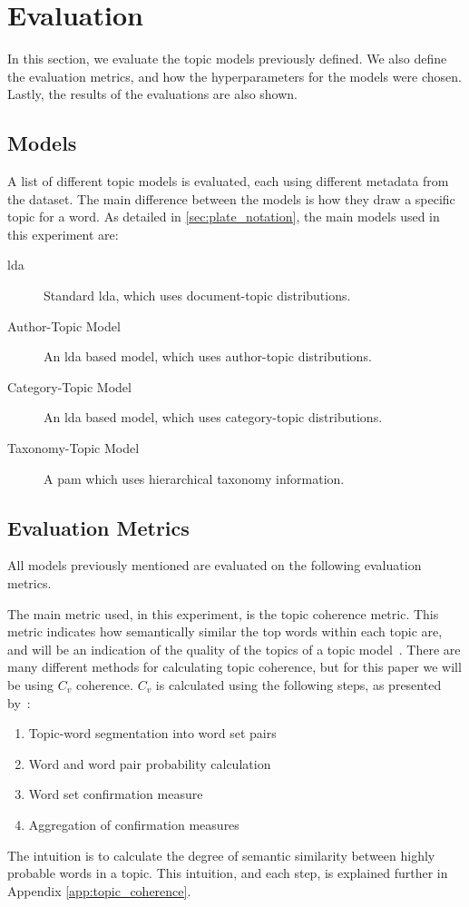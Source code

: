 \section{Evaluation}\label{sec:experiment}
In this section, we evaluate the topic models previously defined.
We also define the evaluation metrics, and how the hyperparameters for the models were chosen.
Lastly, the results of the evaluations are also shown.

\subsection{Models}\label{sec:experiment_models}
A list of different topic models is evaluated, each using different metadata from the dataset.
The main difference between the models is how they draw a specific topic for a word.
As detailed in \autoref{sec:plate_notation}, the main models used in this experiment are:
\begin{description}
	\item[\Acrlong{lda}] Standard \gls{lda}, which uses document-topic distributions.
	\item[Author-Topic Model]\cite{author_topic_2012} An \gls{lda} based model, which uses author-topic distributions.
	\item[Category-Topic Model] An \gls{lda} based model, which uses category-topic distributions.
	\item[Taxonomy-Topic Model] A \acrlong{pam} which uses hierarchical taxonomy information.
\end{description}

\subsection{Evaluation Metrics}\label{sec:experiment_metrics}
All models previously mentioned are evaluated on the following evaluation metrics.

The main metric used, in this experiment, is the topic coherence metric.
This metric indicates how semantically similar the top words within each topic are, and will be an indication of the quality of the topics of a topic model~\cite{topic_coherence_2015}.
There are many different methods for calculating topic coherence, but for this paper we will be using $C_v$ coherence.
$C_v$ is calculated using the following steps, as presented by~\citet{Syed2017coherence}:
\begin{enumerate}
	\item Topic-word segmentation into word set pairs
	\item Word and word pair probability calculation
	\item Word set confirmation measure
	\item Aggregation of confirmation measures
\end{enumerate}
The intuition is to calculate the degree of semantic similarity between highly probable words in a topic.
This intuition, and each step, is explained further in Appendix \autoref{app:topic_coherence}.

